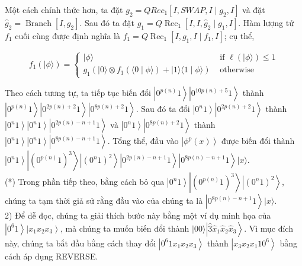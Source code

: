 \documentclass[10pt]{article}
\begin{document}
Một cách chính thức hơn, ta đặt $g_{2}=Q R e c_{1}\left[I, S W A P, I \mid g_{2}, I\right]$ và đặt $\hat{g}_{2}=\operatorname{Branch}\left[I, g_{2}\right]$. Sau đó ta đặt $g_{1}= Q \operatorname{Rec}_{1}\left[I, I, \hat{g}_{2} \mid g_{1}, I\right]$. Hàm lượng tử $f_{1}$ cuối cùng được định nghĩa là $f_{1}=Q \operatorname{Rec}_{1}\left[I, g_{1}, I \mid f_{1}, I\right]$; cụ thể,

$$
f_{1}(|\phi\rangle)= \begin{cases}|\phi\rangle & \text { if } \ell(|\phi\rangle) \leq 1 \\ g_{1}\left(|0\rangle \otimes f_{1}(\langle 0 \mid \phi\rangle)+|1\rangle\langle 1 \mid \phi\rangle\right) & \text { otherwise }\end{cases}
$$

Theo cách tương tự, ta tiếp tục biến đổi $\left|0^{p(n)} 1\right\rangle\left|0^{10 p(n)+5} 1\right\rangle$ thành $\left|0^{p(n)} 1\right\rangle\left|0^{2 p(n)+2} 1\right\rangle\left|0^{8 p(n)+2} 1\right\rangle$. Sau đó ta đổi $\left|0^{n} 1\right\rangle\left|0^{2 p(n)+2} 1\right\rangle$ thành $\left|0^{n} 1\right\rangle\left|0^{n} 1\right\rangle\left|0^{2 p(n)-n+1} 1\right\rangle$ và $\left|0^{n} 1\right\rangle\left|0^{8 p(n)+2} 1\right\rangle$ thành $\left|0^{n} 1\right\rangle\left|0^{n} 1\right\rangle\left|0^{8 p(n)-n+1} 1\right\rangle$. Tổng thể, đầu vào $\left|\phi^{p}(x)\right\rangle$ được biến đổi thành $\left|0^{n} 1\right\rangle\left|\left(0^{p(n)} 1\right)^{3}\right\rangle\left|\left(0^{n} 1\right)^{2}\right\rangle\left|0^{2 p(n)-n+1} 1\right\rangle\left|0^{8 p(n)-n+1} 1\right\rangle|x\rangle$.\\
(*) Trong phần tiếp theo, bằng cách bỏ qua $\left|0^{n} 1\right\rangle\left|\left(0^{p(n)} 1\right)^{3}\right\rangle\left|\left(0^{n} 1\right)^{2}\right\rangle$, chúng ta tạm thời giả sử rằng đầu vào của chúng ta là $\left|0^{8 p(n)-n+1} 1\right\rangle|x\rangle$.\\
2) Để dễ đọc, chúng ta giải thích bước này bằng một ví dụ minh họa của $\left|0^{6} 1\right\rangle\left|x_{1} x_{2} x_{3}\right\rangle$, mà chúng ta muốn biến đổi thành $|00\rangle\left|\hat{3} \hat{x}_{1} \hat{x}_{2} \hat{x}_{3}\right\rangle$. Vì mục đích này, chúng ta bắt đầu bằng cách thay đổi $\left|0^{6} 1 x_{1} x_{2} x_{3}\right\rangle$ thành $\left|x_{3} x_{2} x_{1} 10^{6}\right\rangle$ bằng cách áp dụng REVERSE.
\end{document}
